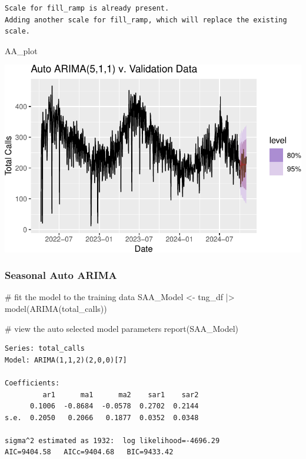 \documentclass[
  letterpaper,
  DIV=11,
  numbers=noendperiod]{scrartcl}
\newenvironment{Shaded}{\begin{snugshade}}{\end{snugshade}}
\newcommand{\CommentTok}[1]{\textcolor[rgb]{0.37,0.37,0.37}{#1}}
\newcommand{\FunctionTok}[1]{\textcolor[rgb]{0.28,0.35,0.67}{#1}}
\newcommand{\NormalTok}[1]{\textcolor[rgb]{0.00,0.23,0.31}{#1}}
\newcommand{\OtherTok}[1]{\textcolor[rgb]{0.00,0.23,0.31}{#1}}
\newcommand{\SpecialCharTok}[1]{\textcolor[rgb]{0.37,0.37,0.37}{#1}}
\begin{document}
\begin{verbatim}
Scale for fill_ramp is already present.
Adding another scale for fill_ramp, which will replace the existing scale.
\end{verbatim}

\begin{Shaded}
\begin{Highlighting}[]
\NormalTok{AA\_plot}
\end{Highlighting}
\end{Shaded}

\includegraphics{final_proj_group1_files/figure-pdf/unnamed-chunk-11-1.pdf}

\subsubsection{Seasonal Auto ARIMA}\label{seasonal-auto-arima}

\begin{Shaded}
\begin{Highlighting}[]
\CommentTok{\# fit the model to the training data}
\NormalTok{SAA\_Model }\OtherTok{\textless{}{-}}\NormalTok{ tng\_df }\SpecialCharTok{|\textgreater{}}
  \FunctionTok{model}\NormalTok{(}\FunctionTok{ARIMA}\NormalTok{(total\_calls))}

\CommentTok{\# view the auto selected model parameters}
\FunctionTok{report}\NormalTok{(SAA\_Model)}
\end{Highlighting}
\end{Shaded}

\begin{verbatim}
Series: total_calls 
Model: ARIMA(1,1,2)(2,0,0)[7] 

Coefficients:
         ar1      ma1      ma2    sar1    sar2
      0.1006  -0.8684  -0.0578  0.2702  0.2144
s.e.  0.2050   0.2066   0.1877  0.0352  0.0348

sigma^2 estimated as 1932:  log likelihood=-4696.29
AIC=9404.58   AICc=9404.68   BIC=9433.42
\end{verbatim}
\end{document}

